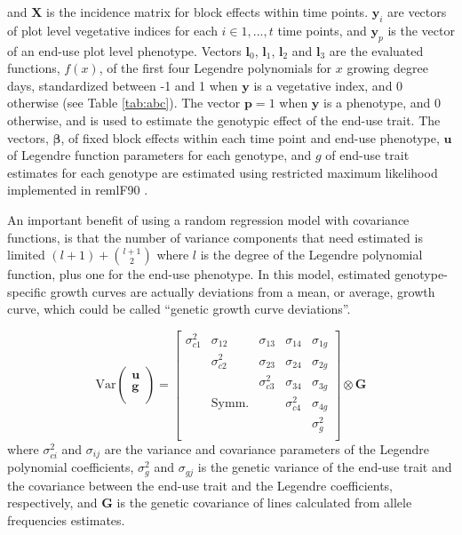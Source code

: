 \documentclass[12pt, letterpaper]{article}
\begin{document}
\noindent and $\mathbf{X}$ is the incidence matrix for block effects within time points. $\mathbf{y}_i$ are vectors of plot level vegetative indices for each $i \in {1, ..., t}$ time points, and $\mathbf{y}_p$ is the vector of an end-use plot level phenotype. Vectors $\mathbf{l}_0$, $\mathbf{l}_1$, $\mathbf{l}_2$ and $\mathbf{l}_3$ are the evaluated functions, $f(x)$, of the first four Legendre polynomials for $x$ growing degree days, standardized between -1 and 1 when $\mathbf{y}$ is a vegetative index, and 0 otherwise (see Table \ref{tab:abc}). The vector $\mathbf{p} = 1$ when $\mathbf{y}$ is a phenotype, and 0 otherwise, and is used to estimate the genotypic effect of the end-use trait. The vectors, $\boldsymbol \beta$, of fixed block effects within each time point and end-use phenotype, $\mathbf{u}$ of Legendre function parameters for each genotype, and $g$ of end-use trait estimates for each genotype are estimated using restricted maximum likelihood implemented in remlF90 \parencite{misztal2002}.

An important benefit of using a random regression model with covariance functions, is that the number of variance components that need estimated is limited $(l+1) + \binom{l+1}{2}$ where $l$ is the degree of the Legendre polynomial function, plus one for the end-use phenotype. In this model, estimated genotype-specific growth curves are actually deviations from a mean, or average, growth curve, which could be called ``genetic growth curve deviations''.



\begin{equation}
 \text{Var}\begin{pmatrix}
    \mathbf{u} \\
    \mathbf{g} \\
  \end{pmatrix} = \begin{bmatrix}
    \sigma^2_{c1} & \sigma_{12} & \sigma_{13} & \sigma_{14} & \sigma_{1g} \\
     & \sigma^2_{c2} & \sigma_{23} & \sigma_{24} & \sigma_{2g} \\
     & & \sigma^2_{c3} & \sigma_{34} & \sigma_{3g} \\
     & \text{Symm.} & & \sigma^2_{c4} & \sigma_{4g} \\
     & & & & \sigma^2_{g} \\
  \end{bmatrix} \otimes \mathbf{G}
\end{equation}
\noindent where $\sigma^2_{ci}$ and $\sigma_{ij}$ are the variance and covariance parameters of the Legendre polynomial coefficients, $\sigma^2_{g}$ and $\sigma_{gj}$ is the genetic variance of the end-use trait and the covariance between the end-use trait and the Legendre coefficients, respectively, and $\mathbf{G}$ is the genetic covariance of lines calculated from allele frequencies estimates. 
\end{document}

